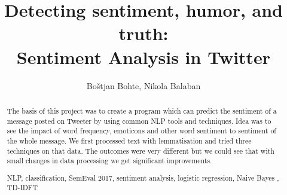 \documentclass[runningheads,a4paper]{llncs}
\newcommand{\keywords}[1]{\par\addvspace\baselineskip
\noindent\keywordname\enspace\ignorespaces#1}
\begin{document}
\mainmatter  %

\title{Detecting sentiment, humor, and truth:\\Sentiment Analysis in Twitter}


%
%
\author{Bo\v{s}tjan Bohte, Nikola Balaban}%

%


%
%

\maketitle


\begin{abstract}
The basis of this project was to create a program which can predict the sentiment of a message posted on Tweeter by using common NLP tools and techniques. Idea was to see the impact of word frequency, emoticons and other word sentiment to sentiment of the whole message. We first processed text with lemmatisation and tried three techniques on that data. The outcomes were very different but we could see that with small changes in data processing we get significant improvements.
\keywords{NLP, classification, SemEval 2017, sentiment analysis, logistic regression, Naive Bayes , TD-IDFT}
\end{abstract}
\end{document}
